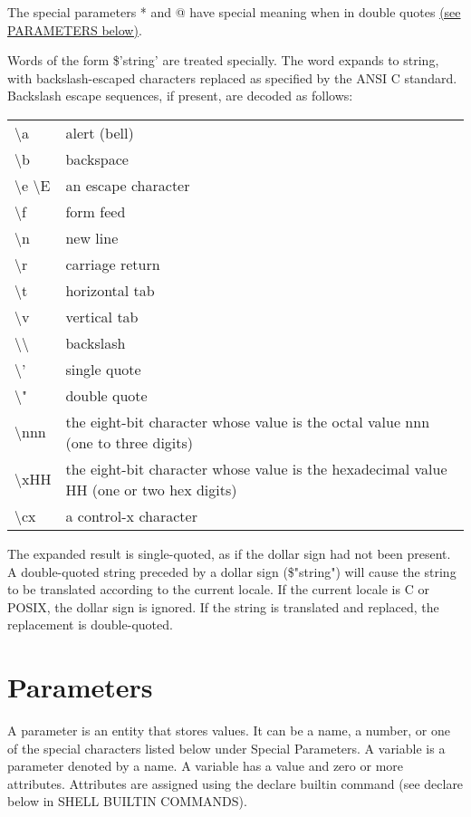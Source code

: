 \documentclass[11pt]{article}
\begin{document}
The special parameters * and @ have special meaning when in double quotes \hyperref[sec:parameters]{(see PARAMETERS below)}.

Words of the form \$'string' are treated specially. The word expands to string, with backslash-escaped characters replaced as specified by the ANSI C standard. Backslash escape sequences, if present, are decoded as follows:

\begin{longtable}{p{}p{}}
\textbackslash a &
alert (bell) \\
\textbackslash b &
backspace \\
\textbackslash e \newline
\textbackslash E &
an escape character \\
\textbackslash f &
form feed \\
\textbackslash n &
new line \\
\textbackslash r &
carriage return \\
\textbackslash t &
horizontal tab \\
\textbackslash v &
vertical tab \\
\textbackslash\textbackslash &
backslash \\
\textbackslash ' &
single quote \\
\textbackslash " &
double quote \\
\textbackslash nnn &
the eight-bit character whose value is the octal value nnn (one to three digits) \\
\textbackslash xHH &
the eight-bit character whose value is the hexadecimal value HH (one or two hex digits) \\
\textbackslash cx &
a control-x character
\end{longtable}

The expanded result is single-quoted, as if the dollar sign had not been present.
A double-quoted string preceded by a dollar sign (\$"string") will cause the string to be translated according to the current locale. If the current locale is C or POSIX, the dollar sign is ignored. If the string is translated and replaced, the replacement is double-quoted.

\section{Parameters}\label{sec:parameters}
A parameter is an entity that stores values. It can be a name, a number, or one of the special characters listed below under Special Parameters. A variable is a parameter denoted by a name. A variable has a value and zero or more attributes. Attributes are assigned using the declare builtin command (see declare below in SHELL BUILTIN COMMANDS).
\end{document}

